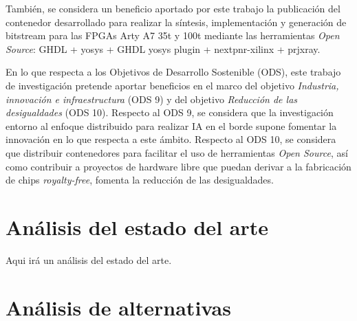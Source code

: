 También, se considera un beneficio aportado por este trabajo la publicación del contenedor \cite{gh:conatiner-implarty} desarrollado para realizar la síntesis, implementación y generación de bitstream para las FPGAs Arty A7 35t y 100t mediante las herramientas \textit{Open Source}: GHDL + yosys + GHDL yosys plugin + nextpnr-xilinx + prjxray.

En lo que respecta a los Objetivos de Desarrollo Sostenible (ODS), este trabajo de investigación pretende aportar beneficios en el marco del objetivo \textit{Industria, innovación e infraestructura} (ODS 9) y del objetivo \textit{Reducción de las desigualdades} (ODS 10). 
Respecto al ODS 9, se considera que la investigación entorno al enfoque distribuido para realizar IA en el borde supone fomentar la innovación en lo que respecta a este ámbito.
Respecto al ODS 10, se considera que distribuir contenedores para facilitar el uso de herramientas \textit{Open Source}, así como contribuir a proyectos de hardware libre que puedan derivar a la fabricación de chips \textit{royalty-free}, fomenta la reducción de las desigualdades.

\section{Análisis del estado del arte}

Aqui irá un análisis del estado del arte.

\section{Análisis de alternativas}

